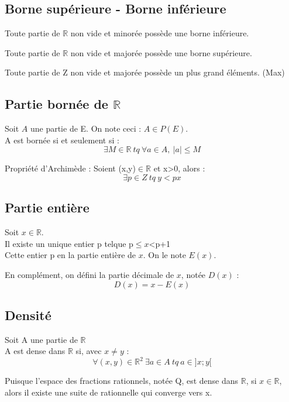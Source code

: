 \subsection{Borne supérieure - Borne inférieure}
\begin{prop}
Toute partie de $\mathbb{R}$ non vide et minorée possède une borne inférieure.
\end{prop}
\begin{prop}
Toute partie de $\mathbb{R}$ non vide et majorée possède une borne supérieure.
\end{prop}
\begin{prop}
Toute partie de Z non vide et majorée possède un plus grand éléments. (Max)
\end{prop}
\subsection{Partie bornée de $\mathbb{R}$}
Soit $A$ une partie de E. On note ceci : $A \in P(E)$.\\
A est bornée si et seulement si :$$\exists M \in \mathbb{R}~ tq~ \forall a\in A,~ |a|\leq M$$
\begin{prop}
Propriété d'Archimède : Soient (x,y)$\in \mathbb{R}$ et x>0, alors :
$$\exists p \in Z~ tq~ y < px$$
\end{prop}
\subsection{Partie entière}
\begin{de}
Soit $x \in \mathbb{R}$.\\
Il existe un unique entier p telque p$\leq x$<p+1\\
Cette entier p en la partie entière de $x$. On le note $E(x)$.
\end{de}
\begin{de}
En complément, on défini la partie décimale de $x$, notée $D(x)$ :
$$D(x) = x-E(x)$$
\end{de}
\subsection{Densité}
\begin{de}
Soit A une partie de $\mathbb{R}$\\
A est dense dans $\mathbb{R}$ si, avec $x \neq y$ :
$$\forall(x,y) \in \mathbb{R}^2~ \exists a \in A~ tq~ a\in]x;y[$$
\end{de}
\begin{prop}
Puisque l'espace des fractions rationnels, notée Q, est dense dans $\mathbb{R}$, si $x \in \mathbb{R}$, alors il existe une suite de rationnelle qui converge vers x. 
\end{prop}
